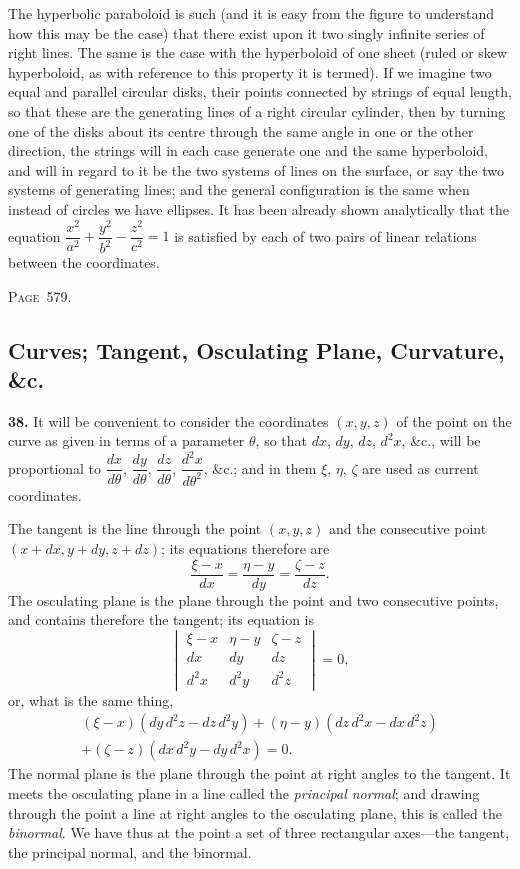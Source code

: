 \documentclass[11pt,a4paper]{article}
\theoremstyle{definition}
\begin{document}
The hyperbolic paraboloid is such (and it is easy from the figure to understand how this may be the case) that there exist upon it two singly infinite series of right lines. The same is the case with the hyperboloid of one sheet (ruled or skew hyperboloid, as with reference to this property it is termed). If we imagine two equal and parallel circular disks, their points connected by strings of equal length, so that these are the generating lines of a right circular cylinder, then by turning one of the disks about its centre through the same angle in one or the other direction, the strings will in each case generate one and the same hyperboloid, and will in regard to it be the two systems of lines on the surface, or say the two systems of generating lines; and the general configuration is the same when instead of circles we have ellipses. It has been already shown analytically that the equation $\dfrac{x^2}{a^2}+\dfrac{y^2}{b^2}-\dfrac{z^2}{c^2}=1$ is satisfied by each of two pairs of linear relations between the coordinates.

\newpage
\noindent\textsc{Page~579.} \subsection*{Curves; Tangent, Osculating Plane, Curvature, \&c.}

\textbf{38.} It will be convenient to consider the coordinates $(x,y,z)$ of the point on the curve as given in terms of a parameter $\theta$, so that $dx$, $dy$, $dz$, $d^2x$, \&c., will be proportional to $\dfrac{dx}{d\theta}$, $\dfrac{dy}{d\theta}$, $\dfrac{dz}{d\theta}$, $\dfrac{d^2x}{d\theta^2}$, \&c.; and in them $\xi$, $\eta$, $\zeta$ are used as current coordinates.

The tangent is the line through the point $(x,y,z)$ and the consecutive point $(x+dx, y+dy, z+dz)$; its equations therefore are
\[
\frac{\xi-x}{dx}=\frac{\eta-y}{dy}=\frac{\zeta-z}{dz}.
\]
The osculating plane is the plane through the point and two consecutive points, and contains therefore the tangent; its equation is
\[
\begin{vmatrix}
\xi-x & \eta-y & \zeta-z \\
dx & dy & dz \\
d^2x & d^2y & d^2z
\end{vmatrix}=0,
\]
or, what is the same thing,
\begin{multline}
(\xi-x)(dy\,d^2z-dz\,d^2y)+(\eta-y)(dz\,d^2x-dx\,d^2z)\\
+(\zeta-z)(dx\,d^2y-dy\,d^2x)=0.
\end{multline}
The normal plane is the plane through the point at right angles to the tangent. It meets the osculating plane in a line called the \textit{principal normal}; and drawing through the point a line at right angles to the osculating plane, this is called the \textit{binormal}. We have thus at the point a set of three rectangular axes---the tangent, the principal normal, and the binormal.
\end{document}
